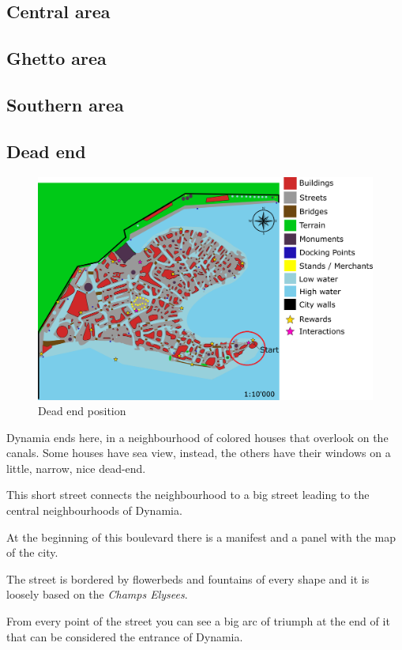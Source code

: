 \subsection{Central area}
\subsection{Ghetto area}
\subsection{Southern area}

\subsection{Dead end}
\begin{figure}[H]
  \centering
  \includegraphics[width=12cm]{Images/Maps/dynamia_deadEnd}
  \caption{Dead end position}
\end{figure}
Dynamia ends here, in a neighbourhood of colored houses that overlook on the canals. Some houses have sea view, instead, the others have their windows on a little, narrow, nice dead-end.

This short street connects the neighbourhood to a big street leading to the central neighbourhoods of Dynamia.

At the beginning of this boulevard there is a manifest and a panel with the map of the city.

The street is bordered by flowerbeds and fountains of every shape and it is loosely based on the \textit{Champs Elysees}.

From every point of the street you can see a big arc of triumph at the end of it that can be considered the entrance of Dynamia.

